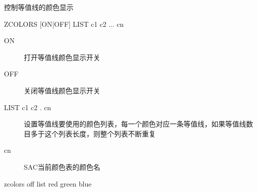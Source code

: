 \label{cmd:zcolors}

控制等值线的颜色显示

\begin{SACSTX}
ZCOLORS [ON|OFF] LIST c1 c2 ... cn
\end{SACSTX}

\begin{description}
\item [ON] 打开等值线颜色显示开关
\item [OFF] 关闭等值线颜色显示开关
\item [LIST c1 c2 . cn] 设置等值线要使用的颜色列表，每一个颜色对应一条等值线，如果等值线数目多于这个列表长度，则整个列表不断重复
\item [cn] SAC当前颜色表的颜色名
\end{description}

\begin{SACDFT}
zcolors off list red green blue
\end{SACDFT}
